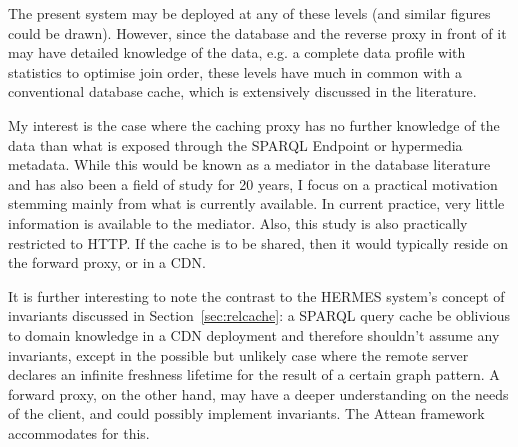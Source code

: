The present system may be deployed at any of these levels (and similar
figures could be drawn). However,
since the database and the reverse proxy in front of it may have
detailed knowledge of the data, e.g. a complete data profile with
statistics to optimise join order, these levels have much in common
with a conventional database cache, which is extensively discussed in
the literature.

My interest is the case where the caching proxy has no further
knowledge of the data than what is exposed through the SPARQL Endpoint
or hypermedia metadata. While this would be known as a mediator in the
database literature and has also been a field of study for 20 years, I
focus on a practical motivation stemming mainly from what is currently
available. In current practice, very little information is available
to the mediator. Also, this study is also practically restricted to
HTTP. If the cache is to be shared, then it would typically reside on
the forward proxy, or in a CDN.

It is further interesting to note the contrast to the HERMES
\cite{adali1996query} system's concept of invariants discussed in
Section~\ref{sec:relcache}: a SPARQL query cache be oblivious
to domain knowledge in a CDN deployment and therefore shouldn't assume any invariants,
except in the possible but unlikely case where the remote server
declares an infinite freshness lifetime for the result of a certain
graph pattern. A forward proxy, on the other hand, may have a deeper
understanding on the needs of the client, and could possibly implement
invariants. The Attean framework accommodates for this.

